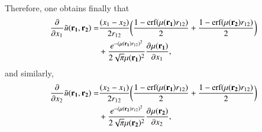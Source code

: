 \documentclass[aip,jcp,reprint,noshowkeys,superscriptaddress]{revtex4-1}
\newcommand{\deriv}[3]{\frac{\partial^{#3} #1}{\partial {#2}^{#3}}}
\newcommand{\bd}[1]{{\bf {#1}}}
\newcommand{\mur}[1]{\mu({\bf r_{#1}})}
\begin{document}
Therefore, one obtains finally that 
\begin{equation}
 \label{eq:d_dx1_jtilde}
 \begin{aligned}
 \deriv{}{x_1}{} \tilde{u}(\bd{r_1},\bd{r_2}) = & \frac{(x_1 - x_2)}{2 r_{12}} 
 \bigg( \frac{1 - \text{erf}(\mur{1} r_{12})}{2} + \frac{1 - \text{erf}(\mur{2} r_{12})}{2}  \bigg) \\
                 & + \frac{e^{-(\mur{1} r_{12})^2}}{2\sqrt{\pi} \mur{1}^2} \deriv{\mur{1}}{x_1}{},
 \end{aligned}
\end{equation}
and similarly,
\begin{equation}
 \label{eq:d_dx2_jtilde}
 \begin{aligned}
 \deriv{}{x_2}{} \tilde{u}(\bd{r_1},\bd{r_2}) = & \frac{(x_2 - x_1)}{2 r_{12}} 
 \bigg( \frac{1 - \text{erf}(\mur{1} r_{12})}{2} + \frac{1 - \text{erf}(\mur{2} r_{12})}{2}  \bigg) \\
                 & + \frac{e^{-(\mur{2} r_{12})^2}}{2\sqrt{\pi} \mur{2}^2} \deriv{\mur{2}}{x_2}{},
 \end{aligned}
\end{equation}
\end{document}
